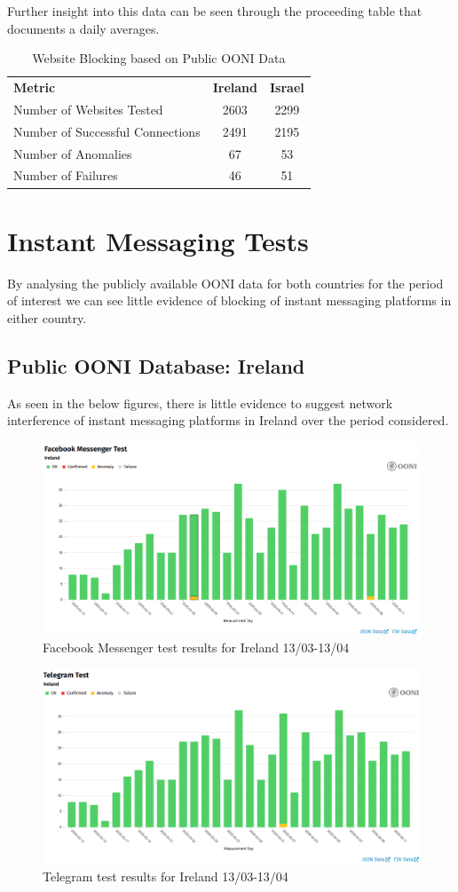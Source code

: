 Further insight into this data can be seen through the proceeding table that documents a daily averages. 

\begin{table} [H]
\centering
\caption{Website Blocking based on Public OONI Data}
\begin{tabular}{lcc}
\toprule
\textbf{Metric} & \textbf{Ireland} & \textbf{Israel} \\
Number of Websites Tested           & 2603 &  2299 \\
Number of Successful Connections    & 2491 & 2195 \\
Number of Anomalies                 & 67 & 53 \\
Number of Failures                  & 46 & 51 \\
\bottomrule
\end{tabular}
\label{tab:category_block}
\end{table}


\section{Instant Messaging Tests}
By analysing the publicly available OONI data for both countries for the period of interest we can see little evidence of blocking of instant messaging platforms in either country.

\subsection{Public OONI Database: Ireland}
As seen in the below figures, there is little evidence to suggest network interference of instant messaging platforms in Ireland over the period considered.

\begin{figure} [H]
    \centering
    \includegraphics[width=0.5\linewidth]{IREOONIDBIMFB.png}
    \caption{Facebook Messenger test results for Ireland 13/03-13/04}
    \label{fig:enter-label}
\end{figure}

\begin{figure} [H]
    \centering
    \includegraphics[width=0.5\linewidth]{IREOONIDBIMTL.png}
    \caption{Telegram test results for Ireland 13/03-13/04}
    \label{fig:enter-label}
\end{figure}

